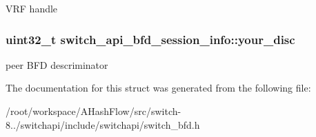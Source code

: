 V\+R\+F handle \hypertarget{structswitch__api__bfd__session__info_a827865b7589bebff798bdfd1769aba8f}{
\subsubsection[{your\+\_\+disc}]{\setlength{\rightskip}{0pt plus 5cm}uint32\+\_\+t switch\+\_\+api\+\_\+bfd\+\_\+session\+\_\+info\+::your\+\_\+disc}}\label{structswitch__api__bfd__session__info_a827865b7589bebff798bdfd1769aba8f}
peer B\+F\+D descriminator 

The documentation for this struct was generated from the following file\+:\begin{DoxyCompactItemize}
\item 
/root/workspace/\+A\+Hash\+Flow/src/switch-\/8../switchapi/include/switchapi/switch\+\_\+bfd.\+h\end{DoxyCompactItemize}
